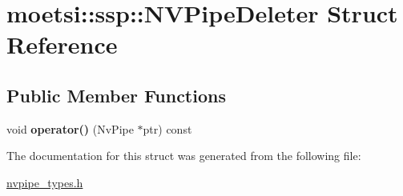 \hypertarget{structmoetsi_1_1ssp_1_1NVPipeDeleter}{}\section{moetsi\+:\+:ssp\+:\+:N\+V\+Pipe\+Deleter Struct Reference}
\label{structmoetsi_1_1ssp_1_1NVPipeDeleter}
\subsection*{Public Member Functions}
\begin{DoxyCompactItemize}
\item 
\mbox{\label{structmoetsi_1_1ssp_1_1NVPipeDeleter_a2fe160c6c0b930c2ab76f7c022644b97}} 
void {\bfseries operator()} (Nv\+Pipe $\ast$ptr) const
\end{DoxyCompactItemize}


The documentation for this struct was generated from the following file\+:\begin{DoxyCompactItemize}
\item 
\hyperlink{nvpipe__types_8h}{nvpipe\+\_\+types.\+h}\end{DoxyCompactItemize}
